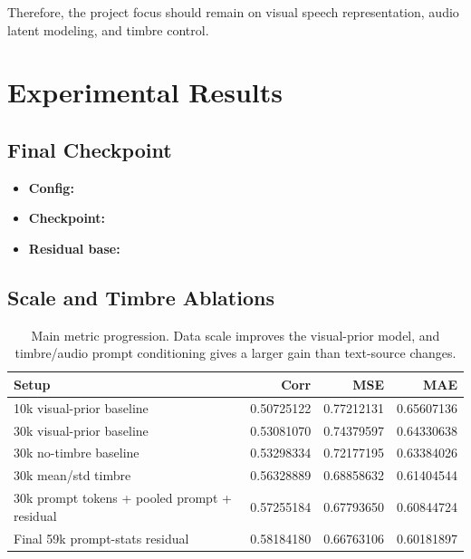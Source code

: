 \documentclass{article}
\begin{document}
Therefore, the project focus should remain on visual speech representation,
audio latent modeling, and timbre control.

\section{Experimental Results}

\subsection{Final Checkpoint}

\begin{itemize}
    \item \textbf{Config:}
    \item \textbf{Checkpoint:}
    \item \textbf{Residual base:}
\end{itemize}

\subsection{Scale and Timbre Ablations}

\begin{table}[h]
\centering
\small
\begin{tabular}{@{}lrrr@{}}
\toprule
\textbf{Setup} & \textbf{Corr} & \textbf{MSE} & \textbf{MAE} \\
\midrule
10k visual-prior baseline & 0.50725122 & 0.77212131 & 0.65607136 \\
30k visual-prior baseline & 0.53081070 & 0.74379597 & 0.64330638 \\
30k no-timbre baseline & 0.53298334 & 0.72177195 & 0.63384026 \\
30k mean/std timbre & 0.56328889 & 0.68858632 & 0.61404544 \\
30k prompt tokens + pooled prompt + residual & 0.57255184 & 0.67793650 & 0.60844724 \\
Final 59k prompt-stats residual & 0.58184180 & 0.66763106 & 0.60181897 \\
\bottomrule
\end{tabular}
\caption{Main metric progression. Data scale improves the visual-prior model,
and timbre/audio prompt conditioning gives a larger gain than text-source
changes.}
\label{tab:main_progression}
\end{table}
\end{document}
